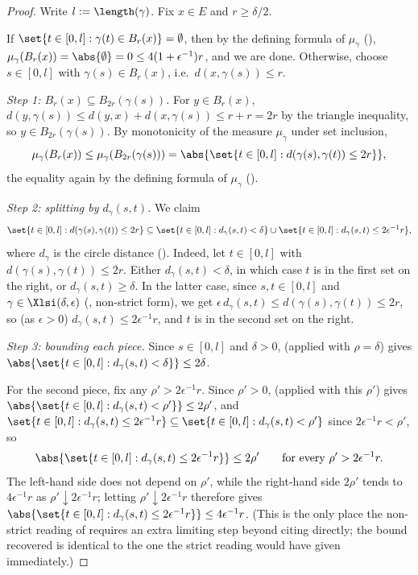 \begin{proof}
  Write $l := \length(\gamma)$. Fix $x \in E$ and $r \geq \delta/2$.

  If $\set{t \in [0,l] : \gamma(t) \in B_r(x)} = \emptyset$, then by the defining formula of
  $\mu_\gamma$ (), $\mu_\gamma(B_r(x)) = \abs{\emptyset} = 0 \leq
  4(1+\epsilon^{-1})r$, and we are done. Otherwise, choose $s \in [0,l]$ with $\gamma(s) \in
  B_r(x)$, i.e.\ $d(x,\gamma(s)) \leq r$.

  \emph{Step 1: $B_r(x) \subseteq B_{2r}(\gamma(s))$.} For $y \in B_r(x)$, $d(y,\gamma(s)) \leq
  d(y,x) + d(x,\gamma(s)) \leq r + r = 2r$ by the triangle inequality, so $y \in B_{2r}(\gamma(s))$.
  By monotonicity of the measure $\mu_\gamma$ under set inclusion,
  \[
    \mu_\gamma(B_r(x)) \leq \mu_\gamma(B_{2r}(\gamma(s)))
    = \abs{\set{t \in [0,l] : d(\gamma(s),\gamma(t)) \leq 2r}}
    ,
  \]
  the equality again by the defining formula of $\mu_\gamma$ ().

  \emph{Step 2: splitting by $d_\gamma(s,t)$.} We claim
  \[
    \set{t \in [0,l] : d(\gamma(s),\gamma(t)) \leq 2r}
    \subseteq
    \set{t \in [0,l] : d_\gamma(s,t) < \delta} \cup \set{t \in [0,l] : d_\gamma(s,t) \leq 2\epsilon^{-1} r}
    ,
  \]
  where $d_\gamma$ is the circle distance (). Indeed, let $t \in [0,l]$ with
  $d(\gamma(s),\gamma(t)) \leq 2r$. Either $d_\gamma(s,t) < \delta$, in which case $t$ is in the
  first set on the right, or $d_\gamma(s,t) \geq \delta$. In the latter case, since $s,t \in
  [0,l]$ and $\gamma \in \Xlsi(\delta,\epsilon)$ (, non-strict form), we get
  $\epsilon\, d_\gamma(s,t) \leq d(\gamma(s),\gamma(t)) \leq 2r$, so (as $\epsilon > 0$)
  $d_\gamma(s,t) \leq 2\epsilon^{-1}r$, and $t$ is in the second set on the right.

  \emph{Step 3: bounding each piece.} Since $s \in [0,l]$ and $\delta > 0$,
   (applied with $\rho = \delta$) gives
  $\abs{\set{t \in [0,l] : d_\gamma(s,t) < \delta}} \leq 2\delta$.

  For the second piece, fix any $\rho' > 2\epsilon^{-1}r$. Since $\rho' > 0$,
   (applied with this $\rho'$) gives $\abs{\set{t \in [0,l] :
  d_\gamma(s,t) < \rho'}} \leq 2\rho'$, and $\set{t \in [0,l] : d_\gamma(s,t) \leq 2\epsilon^{-1}r}
  \subseteq \set{t \in [0,l] : d_\gamma(s,t) < \rho'}$ since $2\epsilon^{-1}r < \rho'$, so
  \[
    \abs{\set{t \in [0,l] : d_\gamma(s,t) \leq 2\epsilon^{-1}r}} \leq 2\rho'
    \qquad \text{for every } \rho' > 2\epsilon^{-1}r
    .
  \]
  The left-hand side does not depend on $\rho'$, while the right-hand side $2\rho'$ tends to
  $4\epsilon^{-1}r$ as $\rho' \downarrow 2\epsilon^{-1}r$; letting $\rho' \downarrow 2\epsilon^{-1}r$
  therefore gives $\abs{\set{t \in [0,l] : d_\gamma(s,t) \leq 2\epsilon^{-1}r}} \leq 4\epsilon^{-1}r$.
  (This is the only place the non-strict reading of  requires an extra limiting
  step beyond citing  directly; the bound recovered is identical to the
  one the strict reading would have given immediately.)


\end{proof}
